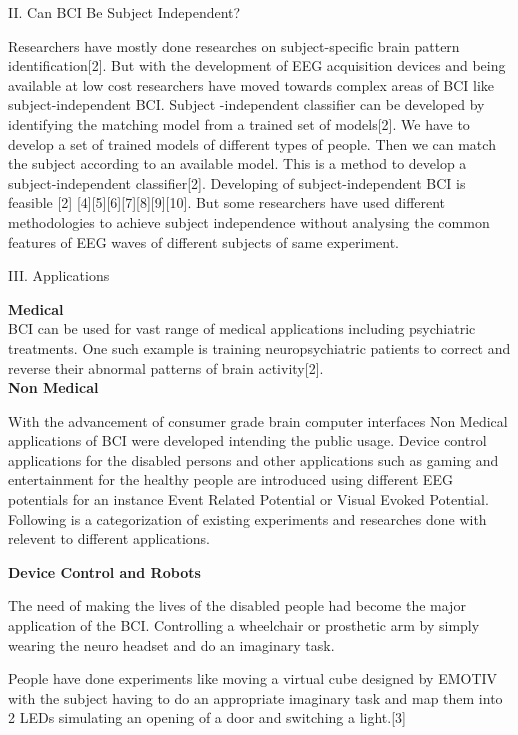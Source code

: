 \documentclass{article}
\begin{document}
\begin{multicols}{2}
\begin{center}
II. Can BCI Be Subject Independent?
\end{center}

Researchers have mostly done researches on subject-specific brain pattern identification[2]. But with the development of EEG acquisition devices and being available at low cost researchers have moved towards complex areas of BCI like subject-independent BCI. Subject -independent classifier can be developed by identifying the matching model from a trained set of models[2]. We have to develop a set of trained models of different types of people. Then we can match the subject according to an available model. This is a method to develop a subject-independent classifier[2]. 
Developing of subject-independent BCI is feasible [2] [4][5][6][7][8][9][10]. But some researchers have used different methodologies to achieve subject independence without analysing the common features of EEG waves of different subjects of same experiment.

\begin{center}
III. Applications
\end{center}
\textbf{Medical} \\
BCI can be used for vast range of medical applications including psychiatric treatments. One such example is training neuropsychiatric patients to correct and reverse their abnormal patterns of brain activity[2]. 
\\ \textbf{Non Medical}
	
	With the advancement of consumer grade brain computer interfaces Non Medical applications of BCI were developed intending the public usage. Device control applications for the disabled persons and other applications such as gaming and entertainment for the healthy people are introduced using different EEG potentials for an instance Event Related Potential or Visual Evoked Potential. Following is a categorization of existing experiments and researches done with relevent to different applications.
	
\textbf{Device Control and Robots}
	
	The need of making the lives of the disabled people had become the major application of the BCI. Controlling a wheelchair or prosthetic arm by simply wearing the neuro headset and do an imaginary task.
	
People have done experiments like moving a virtual cube designed by EMOTIV with the subject having to do an appropriate imaginary task and map them into 2 LEDs simulating an opening of a door and switching a light.[3] 	


\end{multicols}
\end{document}
